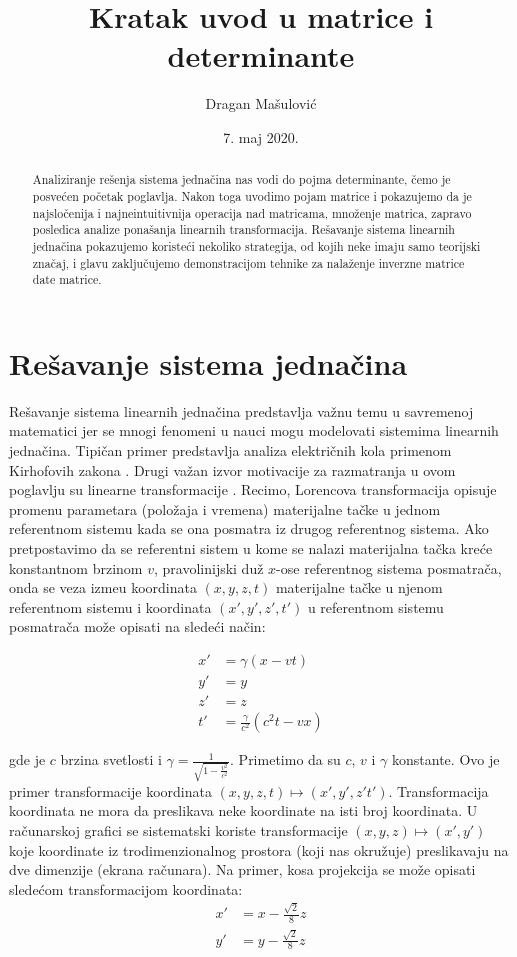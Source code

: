 \documentclass[11pt]{article}
\title{Kratak uvod u matrice i determinante}
\author{Dragan Mašulović}
\date{7. maj 2020.}
\theoremstyle{masulthm}
\theoremstyle{masuldef}
\theoremstyle{masulexmp}
\begin{document}
\maketitle

\begin{abstract}

Analiziranje rešenja sistema jednačina nas vodi do pojma determinante, čemo je posvećen početak
poglavlja. Nakon toga uvodimo pojam matrice i pokazujemo da je najsločenija i najneintuitivnija
operacija nad matricama, množenje matrica, zapravo posledica analize ponašanja linearnih transformacija.
Rešavanje sistema linearnih jednačina pokazujemo koristeći nekoliko strategija, od kojih neke imaju
samo teorijski značaj, i glavu zaključujemo demonstracijom tehnike za nalaženje inverzne matrice date matrice.
    
\end{abstract}

\section{Rešavanje sistema jednačina}

Rešavanje sistema linearnih jednačina predstavlja važnu
temu u savremenoj matematici jer se mnogi fenomeni u nauci mogu modelovati
sistemima linearnih jednačina. Tipičan primer predstavlja analiza
električnih kola primenom Kirhofovih zakona \cite{boyd}.
Drugi važan izvor motivacije za razmatranja u ovom poglavlju su linearne transformacije \cite{axler}.
Recimo, Lorencova transformacija opisuje promenu parametara (položaja i vremena) materijalne tačke
u jednom referentnom sistemu kada se ona posmatra iz drugog referentnog sistema. Ako pretpostavimo
da se referentni sistem u kome se nalazi materijalna tačka kreće konstantnom brzinom $ v $, pravolinijski
duž $ x $-ose referentnog sistema posmatrača, onda se veza izme\dj u koordinata
$ (x, y, z, t) $ materijalne tačke
u njenom referentnom sistemu i koordinata $ (x', y', z', t') $ u referentnom sistemu posmatrača
može opisati na sledeći način:

\begin{align*}
    x' & = \gamma (x - vt) \\
    y' & = y \\
    z' & = z \\
    t' & = \frac{\gamma}{c^2}(c^2 t - vx)
\end{align*}

\noindent
gde je $ c $ brzina svetlosti i $ \gamma = \frac{1}{\sqrt{1 - \frac{v^2}{c^2}}} $. Primetimo da su
$ c $, $ v $ i $ \gamma $
konstante. Ovo je primer transformacije koordinata $ (x, y, z, t) \mapsto (x', y', z' t') $.
Transformacija koordinata ne mora da preslikava neke koordinate na isti broj koordinata. U računarskoj
grafici se sistematski koriste transformacije $ (x, y, z) \mapsto (x' , y') $ koje koordinate iz trodimenzionalnog
prostora (koji nas okružuje) preslikavaju na dve dimenzije (ekrana računara). Na primer, kosa projekcija
se može opisati sledećom transformacijom koordinata:
\begin{align*}
    x' & = x - \frac{\sqrt{2}}{8} z \\
    y' & = y - \frac{\sqrt{2}}{8} z
\end{align*}
\end{document}
